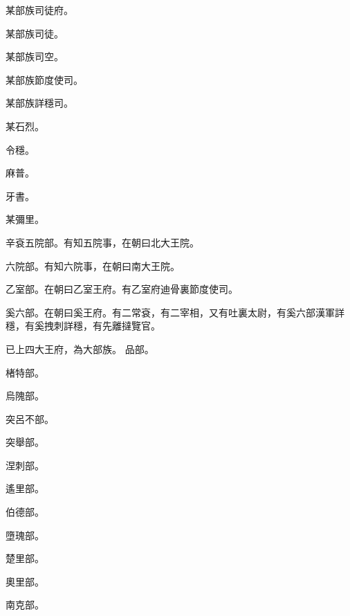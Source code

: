 \begin{pinyinscope}
 某部族司徒府。



 某部族司徒。



 某部族司空。



 某部族節度使司。



 某部族詳穩司。



 某石烈。



 令穩。



 麻普。



 牙書。



 某彌里。



 辛袞五院部。有知五院事，在朝曰北大王院。



 六院部。有知六院事，在朝曰南大王院。



 乙室部。在朝曰乙室王府。有乙室府迪骨裏節度使司。



 奚六部。在朝曰奚王府。有二常袞，有二宰相，又有吐裏太尉，有奚六部漢軍詳穩，有奚拽刺詳穩，有先離撻覽官。



 已上四大王府，為大部族。
 品部。



 楮特部。



 烏隗部。



 突呂不部。



 突舉部。



 涅刺部。



 遙里部。



 伯德部。



 墮瑰部。



 楚里部。



 奧里部。



 南克部。




\end{pinyinscope}
